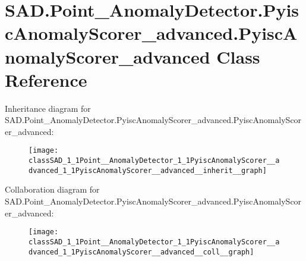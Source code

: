 \hypertarget{classSAD_1_1Point__AnomalyDetector_1_1PyiscAnomalyScorer__advanced_1_1PyiscAnomalyScorer__advanced}{}\section{S\+A\+D.\+Point\+\_\+\+Anomaly\+Detector.\+Pyisc\+Anomaly\+Scorer\+\_\+advanced.\+Pyisc\+Anomaly\+Scorer\+\_\+advanced Class Reference}
\label{classSAD_1_1Point__AnomalyDetector_1_1PyiscAnomalyScorer__advanced_1_1PyiscAnomalyScorer__advanced}


Inheritance diagram for S\+A\+D.\+Point\+\_\+\+Anomaly\+Detector.\+Pyisc\+Anomaly\+Scorer\+\_\+advanced.\+Pyisc\+Anomaly\+Scorer\+\_\+advanced\+:\nopagebreak
\begin{figure}[H]
\begin{center}
\leavevmode
\texttt{[image: classSAD\_1\_1Point\_\_AnomalyDetector\_1\_1PyiscAnomalyScorer\_\_advanced\_1\_1PyiscAnomalyScorer\_\_advanced\_\_inherit\_\_graph]}
\end{center}
\end{figure}


Collaboration diagram for S\+A\+D.\+Point\+\_\+\+Anomaly\+Detector.\+Pyisc\+Anomaly\+Scorer\+\_\+advanced.\+Pyisc\+Anomaly\+Scorer\+\_\+advanced\+:\nopagebreak
\begin{figure}[H]
\begin{center}
\leavevmode
\texttt{[image: classSAD\_1\_1Point\_\_AnomalyDetector\_1\_1PyiscAnomalyScorer\_\_advanced\_1\_1PyiscAnomalyScorer\_\_advanced\_\_coll\_\_graph]}
\end{center}
\end{figure}
